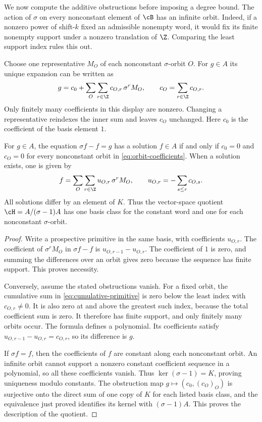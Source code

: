 We now compute the additive obstructions before imposing a degree bound.
The action of $\sigma$ on every nonconstant element of $\cB$ has an
infinite orbit.  Indeed, if a nonzero power of shift-$k$ fixed an
admissible nonempty word, it would fix its finite nonempty support
under a nonzero translation of $\Z$.  Comparing the least support
index rules this out.

Choose one representative $M_O$ of each nonconstant $\sigma$-orbit
$O$.  For $g\in A$ its unique expansion can be written as
\begin{equation}
  g=c_0+\sum_O\sum_{r\in\Z}c_{O,r}\,\sigma^rM_O,
  \qquad c_O=\sum_{r\in\Z}c_{O,r}.
  \label{eq:orbit-coefficients}
\end{equation}
Only finitely many coefficients in this display are nonzero.
Changing a representative reindexes the inner sum and leaves $c_O$
unchanged.  Here $c_0$ is the coefficient of the basis element $1$.

\begin{theorem}
\label{thm:orbit-obstructions}
For $g\in A$, the equation $\sigma f-f=g$ has a solution $f\in A$
if and only if $c_0=0$ and $c_O=0$ for every nonconstant orbit in
\eqref{eq:orbit-coefficients}.  When a solution exists, one is given by
\begin{equation}
  f=\sum_O\sum_{r\in\Z}u_{O,r}\,\sigma^rM_O,
  \qquad u_{O,r}=-\sum_{s\le r}c_{O,s}.
  \label{eq:cumulative-primitive}
\end{equation}
All solutions differ by an element of $K$.  Thus the vector-space
quotient $\cH=A/(\sigma-1)A$ has one basis class for the constant
word and one for each nonconstant $\sigma$-orbit.
\end{theorem}

\begin{proof}
Write a prospective primitive in the same basis, with coefficients
$u_{O,r}$.  The coefficient of $\sigma^rM_O$ in $\sigma f-f$ is
$u_{O,r-1}-u_{O,r}$.  The coefficient of $1$ is zero, and summing
the differences over an orbit gives zero because the sequence has
finite support.  This proves necessity.

Conversely, assume the stated obstructions vanish.  For a fixed orbit,
the cumulative sum in \eqref{eq:cumulative-primitive} is zero below
the least index with $c_{O,r}\ne0$.  It is also zero at and above
the greatest such index, because the total coefficient sum is zero.
It therefore has finite support, and only finitely many orbits occur.
The formula defines a polynomial.  Its coefficients satisfy
$u_{O,r-1}-u_{O,r}=c_{O,r}$, so its difference is $g$.

If $\sigma f=f$, then the coefficients of $f$ are constant along
each nonconstant orbit.  An infinite orbit cannot support a nonzero
constant coefficient sequence in a polynomial, so all these
coefficients vanish.  Thus $\ker(\sigma-1)=K$, proving uniqueness
modulo constants.  The obstruction map
$g\mapsto(c_0,(c_O)_O)$ is surjective onto the direct sum of one
copy of $K$ for each listed basis class, and the equivalence just
proved identifies its kernel with $(\sigma-1)A$.  This proves the
description of the quotient.
\end{proof}

